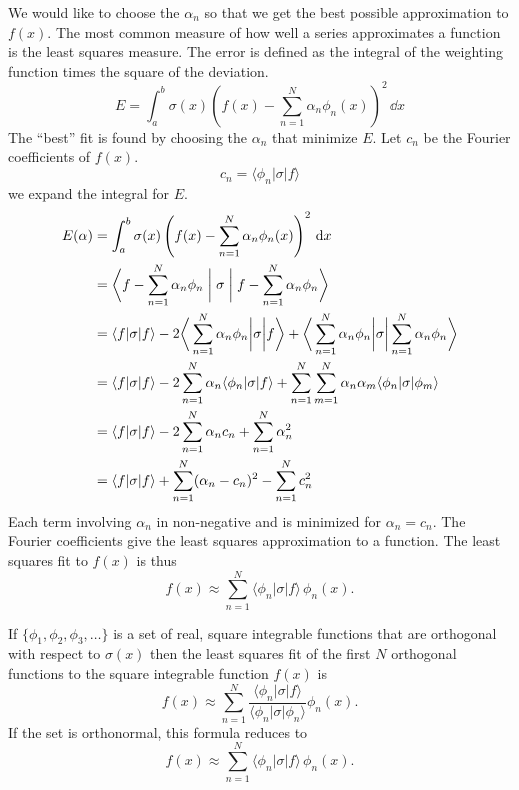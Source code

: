 We would like to choose the $\alpha_n$ so that we get the best possible
approximation to $f(x)$.  The most common measure of how well a series
approximates a function is the least squares measure.  The error 
is defined as the integral of the weighting function times the 
square of the deviation.
\[ 
E = \int_a^b \sigma(x) \left( f(x) - \sum_{n=1}^N \alpha_n \phi_n(x) \right)^2\,\dd x 
\]
The ``best'' fit is found by choosing the $\alpha_n$ that minimize $E$.
Let $c_n$ be the Fourier coefficients of $f(x)$.
\[ 
c_n = \langle \phi_n | \sigma | f \rangle
\]
we expand the integral for $E$.
\begin{align*}
  E(\alpha)
  &= \int_a^b \sigma(x) \left( f(x) - \sum_{n=1}^N \alpha_n \phi_n(x) \right)^2\,\mathrm{d} x 
  \\
  &= \biggl\langle f - \sum_{n=1}^N \alpha_n \phi_n \biggm| \sigma \biggm|
  f - \sum_{n=1}^N \alpha_n \phi_n \biggr\rangle 
  \\
  &= \langle f | \sigma | f \rangle 
  - 2 \bigg\langle \sum_{n=1}^N \alpha_n \phi_n \bigg| \sigma \bigg| f \bigg\rangle
  + \bigg\langle \sum_{n=1}^N \alpha_n \phi_n \bigg| \sigma \bigg| 
  \sum_{n=1}^N \alpha_n \phi_n \bigg\rangle 
  \\
  &= \langle f | \sigma | f \rangle 
  -2 \sum_{n=1}^N \alpha_n \langle \phi_n | \sigma | f \rangle
  + \sum_{n=1}^N \sum_{m=1}^N \alpha_n \alpha_m \langle \phi_n | \sigma | \phi_m \rangle 
  \\
  &= \langle f | \sigma | f \rangle - 2 \sum_{n=1}^N \alpha_n c_n
  + \sum_{n=1}^N \alpha_n^2 
  \\
  &= \langle f | \sigma | f \rangle + \sum_{n=1}^N (\alpha_n - c_n)^2 - \sum_{n=1}^N c_n^2
\end{align*}
Each term involving $\alpha_n$ in non-negative and is minimized for $\alpha_n = c_n$.
The Fourier coefficients give the least squares approximation to a function.
The least squares fit to $f(x)$ is thus
\[ 
f(x) \approx \sum_{n=1}^N \langle \phi_n | \sigma | f \rangle\, \phi_n(x). \]


\begin{Result}
  If $\{\phi_1, \phi_2, \phi_3, \ldots\}$ is a set of real, square integrable
  functions that are orthogonal with respect to $\sigma(x)$
  then the least squares fit of the first $N$ 
  orthogonal functions to the square integrable function $f(x)$ is
  \[ 
  f(x) \approx \sum_{n=1}^N \frac{\langle \phi_n | \sigma | f \rangle}
  {\langle \phi_n | \sigma | \phi_n \rangle} \phi_n(x).
  \]
  If the set is orthonormal, this formula reduces to
  \[ 
  f(x) \approx \sum_{n=1}^N \langle \phi_n | \sigma | f  \rangle\, \phi_n(x).
  \]
\end{Result}



